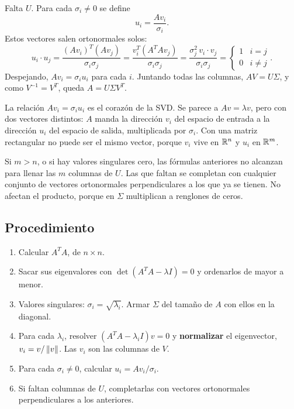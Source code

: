\documentclass[11pt,letterpaper]{article}
\begin{document}
Falta $U$. Para cada $\sigma_i \neq 0$ se define
\[
    u_i = \frac{A v_i}{\sigma_i} .
\]
Estos vectores salen ortonormales solos:
\[
    u_i \cdot u_j = \frac{(Av_i)^{T}(Av_j)}{\sigma_i\sigma_j}
                  = \frac{v_i^{T}(A^{T}Av_j)}{\sigma_i\sigma_j}
                  = \frac{\sigma_j^2\, v_i \cdot v_j}{\sigma_i\sigma_j}
                  = \begin{cases} 1 & i = j \\ 0 & i \neq j
                    \end{cases} .
\]
Despejando, $Av_i = \sigma_i u_i$ para cada $i$. Juntando todas las
columnas, $AV = U\Sigma$, y como $V^{-1} = V^{T}$, queda
$A = U\Sigma V^{T}$.

\begin{idea}
    La relación $Av_i = \sigma_i u_i$ es el corazón de la SVD. Se
    parece a $Av = \lambda v$, pero con dos vectores distintos: $A$
    manda la dirección $v_i$ del espacio de entrada a la dirección
    $u_i$ del espacio de salida, multiplicada por $\sigma_i$. Con una
    matriz rectangular no puede ser el mismo vector, porque $v_i$
    vive en $\mathbb{R}^n$ y $u_i$ en $\mathbb{R}^m$.
\end{idea}

Si $m > n$, o si hay valores singulares cero, las fórmulas anteriores
no alcanzan para llenar las $m$ columnas de $U$. Las que faltan se
completan con cualquier conjunto de vectores ortonormales
perpendiculares a los que ya se tienen. No afectan el producto,
porque en $\Sigma$ multiplican a renglones de ceros.


\subsection*{Procedimiento}

\begin{enumerate}[itemsep=0.3em]
    \item Calcular $A^{T}A$, de $n \times n$.
    \item Sacar sus eigenvalores con $\det(A^{T}A - \lambda I) = 0$ y
          ordenarlos de mayor a menor.
    \item Valores singulares: $\sigma_i = \sqrt{\lambda_i}$. Armar
          $\Sigma$ del tamaño de $A$ con ellos en la diagonal.
    \item Para cada $\lambda_i$, resolver $(A^{T}A - \lambda_i I)v = 0$
          y \textbf{normalizar} el eigenvector,
          $v_i = v / \left\lVert v \right\rVert$. Las $v_i$ son las columnas de $V$.
    \item Para cada $\sigma_i \neq 0$, calcular
          $u_i = Av_i / \sigma_i$.
    \item Si faltan columnas de $U$, completarlas con vectores
          ortonormales perpendiculares a los anteriores.
\end{enumerate}
\end{document}
